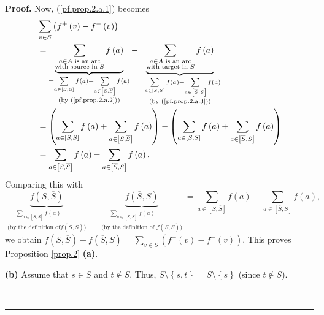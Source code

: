 \documentclass[numbers=enddot,12pt,final,onecolumn,notitlepage]{scrartcl}%
\theoremstyle{definition}
\newenvironment{proof}[1][Proof]{\noindent\textbf{#1.} }{\ \rule{0.5em}{0.5em}}
\let\sumnonlimits\sum
\renewcommand{\sum}{\sumnonlimits\limits}
\begin{document}
\begin{proof}
Now, (\ref{pf.prop.2.a.1}) becomes%
\begin{align*}
&  \sum_{v\in S}\left(  f^{+}\left(  v\right)  -f^{-}\left(  v\right)  \right)
\\
&  =\underbrace{\sum_{\substack{a\in A\text{ is an arc}\\\text{with source in
}S}}f\left(  a\right)  }_{\substack{=\sum_{a\in\left[  S,S\right]  }f\left(
a\right)  +\sum_{a\in\left[  S,\overline{S}\right]  }f\left(  a\right)
\\\text{(by (\ref{pf.prop.2.a.2}))}}}-\underbrace{\sum_{\substack{a\in A\text{
is an arc}\\\text{with target in }S}}f\left(  a\right)  }_{\substack{=\sum
_{a\in\left[  S,S\right]  }f\left(  a\right)  +\sum_{a\in\left[  \overline
{S},S\right]  }f\left(  a\right)  \\\text{(by (\ref{pf.prop.2.a.3}))}}}\\
&  =\left(  \sum_{a\in\left[  S,S\right]  }f\left(  a\right)  +\sum
_{a\in\left[  S,\overline{S}\right]  }f\left(  a\right)  \right)  -\left(
\sum_{a\in\left[  S,S\right]  }f\left(  a\right)  +\sum_{a\in\left[
\overline{S},S\right]  }f\left(  a\right)  \right) \\
&  =\sum_{a\in\left[  S,\overline{S}\right]  }f\left(  a\right)  -\sum
_{a\in\left[  \overline{S},S\right]  }f\left(  a\right)  .
\end{align*}
Comparing this with%
\[
\underbrace{f\left(  S,\overline{S}\right)  }_{\substack{=\sum_{a\in\left[
S,\overline{S}\right]  }f\left(  a\right)  \\\text{(by the definition of
}f\left(  S,\overline{S}\right)  \text{)}}}-\underbrace{f\left(  \overline
{S},S\right)  }_{\substack{=\sum_{a\in\left[  \overline{S},S\right]  }f\left(
a\right)  \\\text{(by the definition of }f\left(  \overline{S},S\right)
\text{)}}}=\sum_{a\in\left[  S,\overline{S}\right]  }f\left(  a\right)
-\sum_{a\in\left[  \overline{S},S\right]  }f\left(  a\right)  ,
\]
we obtain $f\left(  S,\overline{S}\right)  -f\left(  \overline{S},S\right)
=\sum_{v\in S}\left(  f^{+}\left(  v\right)  -f^{-}\left(  v\right)  \right)
$. This proves Proposition \ref{prop.2} \textbf{(a)}.

\textbf{(b)} Assume that $s\in S$ and $t\notin S$. Thus, $S\setminus\left\{
s,t\right\}  =S\setminus\left\{  s\right\}  $ (since $t\notin S$).


\end{proof}
\end{document}

